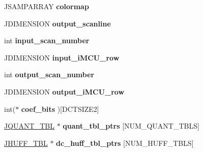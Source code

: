 \begin{DoxyCompactItemize}
J\+S\+A\+M\+P\+A\+R\+R\+AY {\bfseries colormap}
\item 
\mbox{\label{structjpeg__decompress__struct_abbf81679b1802936032f618dd90f8291}} 
J\+D\+I\+M\+E\+N\+S\+I\+ON {\bfseries output\+\_\+scanline}
\item 
\mbox{\label{structjpeg__decompress__struct_a43a1013bf1f6c45afb959f48fd40c66f}} 
int {\bfseries input\+\_\+scan\+\_\+number}
\item 
\mbox{\label{structjpeg__decompress__struct_a6c9d014952341bcfc521ad5b7bce500f}} 
J\+D\+I\+M\+E\+N\+S\+I\+ON {\bfseries input\+\_\+i\+M\+C\+U\+\_\+row}
\item 
\mbox{\label{structjpeg__decompress__struct_abd7d01c79e679a8c8203bc494bc43fb4}} 
int {\bfseries output\+\_\+scan\+\_\+number}
\item 
\mbox{\label{structjpeg__decompress__struct_a8bc74336c804741b32fea874f8410c88}} 
J\+D\+I\+M\+E\+N\+S\+I\+ON {\bfseries output\+\_\+i\+M\+C\+U\+\_\+row}
\item 
\mbox{\label{structjpeg__decompress__struct_a61c024a1b3f2bc0b32ff7c3145ac7f2c}} 
int($\ast$ {\bfseries coef\+\_\+bits} )\mbox{[}D\+C\+T\+S\+I\+Z\+E2\mbox{]}
\item 
\mbox{\label{structjpeg__decompress__struct_a42be2e7197a38cf83e6cebbaac006ca6}} 
\hyperlink{struct_j_q_u_a_n_t___t_b_l}{J\+Q\+U\+A\+N\+T\+\_\+\+T\+BL} $\ast$ {\bfseries quant\+\_\+tbl\+\_\+ptrs} \mbox{[}N\+U\+M\+\_\+\+Q\+U\+A\+N\+T\+\_\+\+T\+B\+LS\mbox{]}
\item 
\mbox{\label{structjpeg__decompress__struct_a805ecdbfbc59d66a6879de06dc4c35e0}} 
\hyperlink{struct_j_h_u_f_f___t_b_l}{J\+H\+U\+F\+F\+\_\+\+T\+BL} $\ast$ {\bfseries dc\+\_\+huff\+\_\+tbl\+\_\+ptrs} \mbox{[}N\+U\+M\+\_\+\+H\+U\+F\+F\+\_\+\+T\+B\+LS\mbox{]}
\item 
\mbox{\label{structjpeg__decompress__struct_a8d6e49569f3edc0ad43ffa5d6a95bb48}} 

\end{DoxyCompactItemize}
